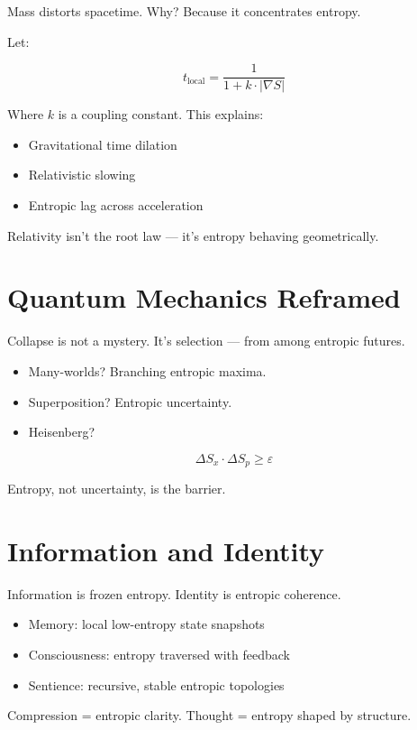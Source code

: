 \documentclass[12pt]{article}
\begin{document}
Mass distorts spacetime. Why? Because it concentrates entropy.

Let:

\[
t_{\text{local}} = \frac{1}{1 + k \cdot |\nabla S|}
\]

Where $k$ is a coupling constant. This explains:

\begin{itemize}
\item Gravitational time dilation
\item Relativistic slowing
\item Entropic lag across acceleration
\end{itemize}

Relativity isn't the root law — it's entropy behaving geometrically.

\section*{Quantum Mechanics Reframed}

Collapse is not a mystery. It's selection — from among entropic futures.

\begin{itemize}
\item Many-worlds? Branching entropic maxima.
\item Superposition? Entropic uncertainty.
\item Heisenberg?
\end{itemize}

\[
\Delta S_x \cdot \Delta S_p \geq \varepsilon
\]

Entropy, not uncertainty, is the barrier.

\section*{Information and Identity}

Information is frozen entropy. Identity is entropic coherence.

\begin{itemize}
\item Memory: local low-entropy state snapshots
\item Consciousness: entropy traversed with feedback
\item Sentience: recursive, stable entropic topologies
\end{itemize}

Compression = entropic clarity. Thought = entropy shaped by structure.
\end{document}
